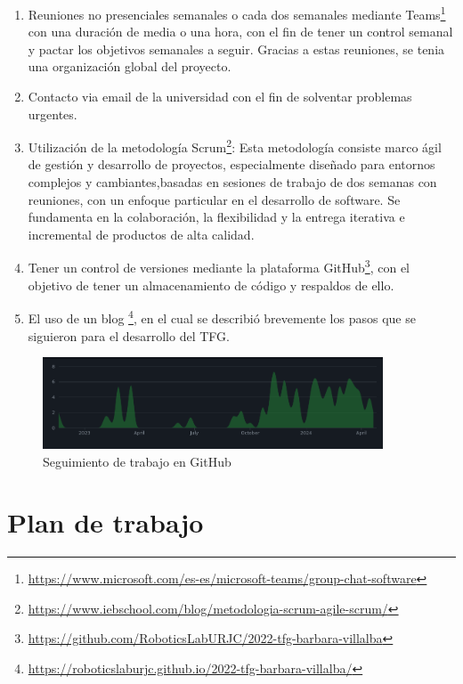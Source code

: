 \begin{enumerate}
    \item Reuniones no presenciales  semanales o cada dos semanales mediante Teams\footnote{\url{https://www.microsoft.com/es-es/microsoft-teams/group-chat-software}} con una duración de media o una hora, con el fin de tener un control semanal y pactar los objetivos semanales a seguir. Gracias a estas reuniones, se tenia una organización global del proyecto. 
    \item Contacto via email de la universidad con el fin de solventar problemas urgentes. 
    \item Utilización de la metodología Scrum\footnote{\url{https://www.iebschool.com/blog/metodologia-scrum-agile-scrum/}}: Esta metodología 
    consiste marco ágil de gestión y desarrollo de proyectos, especialmente diseñado para entornos complejos y cambiantes,basadas en sesiones de trabajo de dos semanas con reuniones,
    con un enfoque particular en el desarrollo de software. Se fundamenta en la colaboración, la flexibilidad y la entrega iterativa e incremental de productos de alta calidad.
    \item Tener un control de versiones mediante la plataforma GitHub\footnote{\url{https://github.com/RoboticsLabURJC/2022-tfg-barbara-villalba}}, con el objetivo de tener un almacenamiento de código y respaldos de ello.  
    \item El uso de un blog \footnote{\url{https://roboticslaburjc.github.io/2022-tfg-barbara-villalba/}}, en el cual se describió brevemente los pasos que se siguieron para el desarrollo del TFG.
\end{enumerate}

\begin{figure} [H]
    \begin{center}
      \includegraphics[width=0.9\textwidth,height=0.3\textwidth]{figs/objetivos/github.png}
    \end{center}
    \caption{Seguimiento de trabajo en GitHub}
    \label{fig:github}
  \end{figure}


\section{Plan de trabajo}
\label{sec:plantrabajo}

